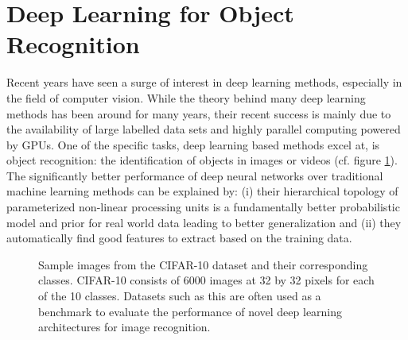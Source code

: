 \section{Deep Learning for Object Recognition}
Recent years have seen a surge of interest in deep learning methods, especially in the field of computer vision. While the theory behind many deep learning methods has been around for many years, their recent success is mainly due to the availability of large labelled data sets and highly parallel computing powered by GPUs. One of the specific tasks, deep learning based methods excel at, is object recognition: the identification of objects in images or videos (cf. figure \ref{fig:cifar10}). The significantly better performance of deep neural networks over traditional machine learning methods can be explained by: (i) their hierarchical topology of parameterized non-linear processing units is a fundamentally better probabilistic model and prior for real world data leading to better generalization and (ii) they automatically find good features to extract based on the training data.
\begin{figure}
    \centering
{}\noindent
\caption[CIFAR-10 classes and sample images]{Sample images from the CIFAR-10 \cite{cifar10} dataset and their corresponding classes. CIFAR-10 consists of 6000 images at 32 by 32 pixels for each of the 10 classes. Datasets such as this are often used as a benchmark to evaluate the performance of novel deep learning architectures for image recognition.}\label{fig:cifar10}
\end{figure}
